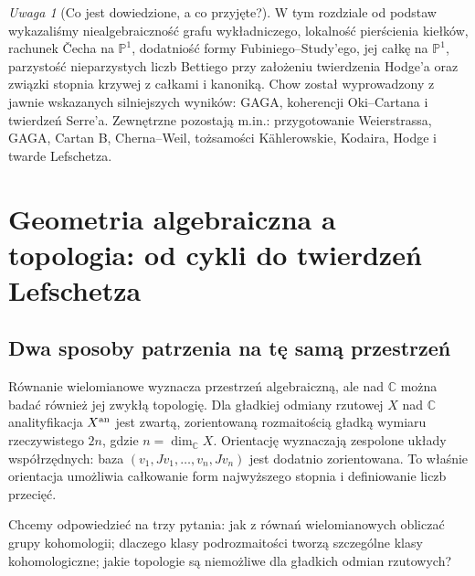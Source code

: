 \documentclass[11pt,a4paper,openany]{report}
\numberwithin{equation}{section}
\theoremstyle{plain}
\theoremstyle{definition}
\theoremstyle{remark}
\newtheorem{uwaga}[twierdzenie]{Uwaga}
\newcommand{\C}{\mathbb C}
\newcommand{\PP}{\mathbb P}
\begin{document}
\begin{uwaga}[Co jest dowiedzione, a co przyjęte?]
W tym rozdziale od podstaw wykazaliśmy niealgebraiczność
grafu wykładniczego, lokalność pierścienia kiełków,
rachunek Čecha na $\PP^1$, dodatniość formy
Fubiniego--Study'ego, jej całkę na $\PP^1$,
parzystość nieparzystych liczb Bettiego przy
założeniu twierdzenia Hodge'a oraz związki
stopnia krzywej z całkami i kanoniką.
Chow został wyprowadzony z jawnie wskazanych
silniejszych wyników: GAGA, koherencji Oki--Cartana
i twierdzeń Serre'a. Zewnętrzne pozostają m.in.:
przygotowanie Weierstrassa, GAGA, Cartan B,
Cherna--Weil, tożsamości Kählerowskie,
Kodaira, Hodge i twarde Lefschetza.
\end{uwaga}




\chapter{Geometria algebraiczna a topologia: od cykli do twierdzeń Lefschetza}
\label{ch:ga10-topologia}

\providecommand{\atlasref}[2]{#2}


\section{Dwa sposoby patrzenia na tę samą przestrzeń}
\label{sec:ga10-punkt-wyjscia}

Równanie wielomianowe wyznacza przestrzeń algebraiczną, ale nad $\C$
można badać również jej zwykłą topologię. Dla gładkiej odmiany
rzutowej $X$ nad $\C$ analityfikacja $X^{\rm an}$ jest zwartą,
zorientowaną rozmaitością gładką wymiaru rzeczywistego $2n$,
gdzie $n=\dim_{\C}X$. Orientację wyznaczają zespolone układy
współrzędnych: baza $(v_1,Jv_1,\ldots,v_n,Jv_n)$ jest dodatnio
zorientowana. To właśnie orientacja umożliwia całkowanie form
najwyższego stopnia i definiowanie liczb przecięć.

Chcemy odpowiedzieć na trzy pytania: jak z równań wielomianowych
obliczać grupy kohomologii; dlaczego klasy podrozmaitości tworzą
szczególne klasy kohomologiczne; jakie topologie są niemożliwe
dla gładkich odmian rzutowych?
\end{document}
